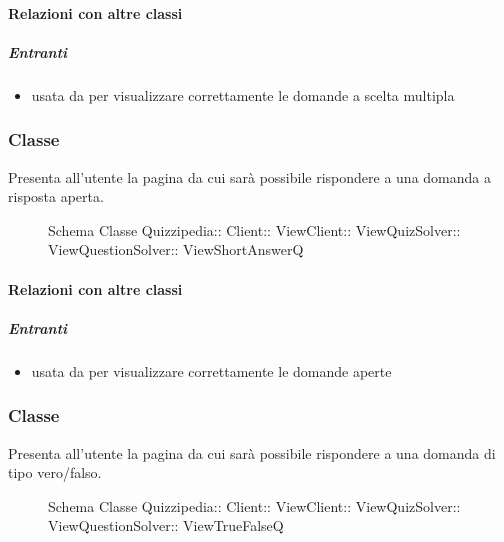 \paragraph{Relazioni con altre classi}
\subparagraph{Entranti}
\begin{itemize}
\item usata da  per visualizzare correttamente le domande a scelta multipla
\end{itemize}
\subsubsection{Classe }
Presenta all'utente la pagina da cui sarà possibile rispondere a una domanda a risposta aperta.
\begin{figure}[H]
\centering
\noindent{}
\caption[Schema Classe ViewShortAnswerQ]{Schema Classe Quizzipedia:: Client:: ViewClient:: ViewQuizSolver:: ViewQuestionSolver:: ViewShortAnswerQ}
\end{figure}
\paragraph{Relazioni con altre classi}
\subparagraph{Entranti}
\begin{itemize}
\item usata da  per visualizzare correttamente le domande aperte
\end{itemize}
\subsubsection{Classe }
Presenta all'utente la pagina da cui sarà possibile rispondere a una domanda di tipo vero/falso.
\begin{figure}[H]
\centering
\noindent{}
\caption[Schema Classe ViewTrueFalseQ]{Schema Classe Quizzipedia:: Client:: ViewClient:: ViewQuizSolver:: ViewQuestionSolver:: ViewTrueFalseQ}
\end{figure}
